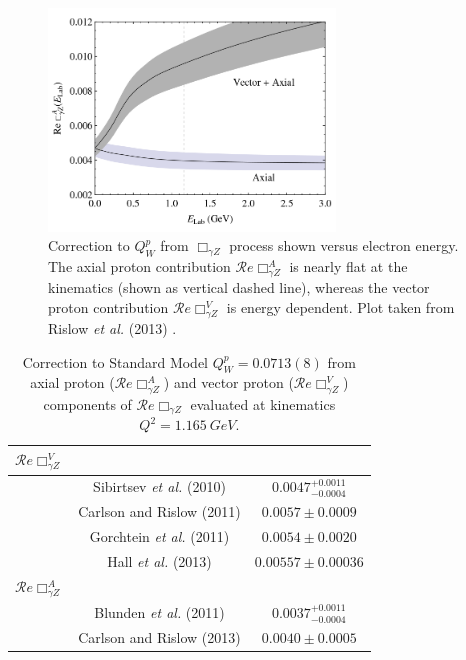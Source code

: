 \begin{figure}[ht]
\centering
\includegraphics[width=3in]{Pictures/gamma_z.png}
\caption{Correction to $Q_W^p$ from $\Box_{\gamma Z}$ process shown versus electron energy. The axial proton contribution $\mathcal{R}e\Box_{\gamma Z}^A$ is nearly flat at the \Qs kinematics (shown as vertical dashed line), whereas the vector proton contribution $\mathcal{R}e\Box_{\gamma Z}^V$ is energy dependent. Plot taken from Rislow {\it et al.} (2013) \cite{Carlson2013}.}
\label{fig:gamma_Z}
\end{figure}

\begin{table}[ht]
\begin{center}
\caption{Correction to Standard Model $Q_W^p=0.0713(8)$ from axial proton ($\mathcal{R}e\Box_{\gamma Z}^A$) and vector proton ($\mathcal{R}e\Box_{\gamma Z}^V$) components of $\mathcal{R}e\Box_{\gamma Z}$ evaluated at \Qs kinematics $Q^2=1.165~GeV$.}
\label{tab:gamma_Z_correction}
\begin{tabular}{l|c|c}\hline
$\mathcal{R}e\Box_{\gamma Z}^V$&~&~\\
\hline
~&Sibirtsev {\it et al.} (2010) \cite{Sibirtsev2010}&$0.0047_{-0.0004}^{+0.0011}$\\
~&Carlson and Rislow (2011) \cite{Carlson2011}&$0.0057\pm 0.0009$\\
~&Gorchtein {\it et al.} (2011) \cite{Gorchtein2011}&$0.0054\pm 0.0020$\\
~&Hall {\it et al.} (2013) \cite{Hall2013}&$0.00557\pm0.00036$\\
\hline
$\mathcal{R}e\Box_{\gamma Z}^A$&~&~\\
\hline
~&Blunden {\it et al.} (2011) \cite{Blunden2011} &$0.0037_{-0.0004}^{+0.0011}$\\
~&Carlson and Rislow (2013) \cite{Carlson2013}&$0.0040\pm 0.0005$\\
\hline

\end{tabular}
\end{center}
\end{table}


